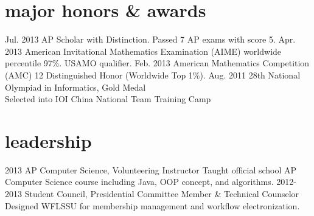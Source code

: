 \documentclass[print]{friggeri-cv} %
\begin{document}



\section{major honors \& awards}

\begin{entrylist}
  \centry
  {Jul. 2013}
  {AP Scholar with Distinction. Passed 7 AP exams with score 5. }
  \centry
  {Apr. 2013}
  {American Invitational Mathematics Examination (AIME) worldwide percentile 97\%. USAMO qualifier. }
  \centry
  {Feb. 2013}
  {American Mathematics Competition (AMC) 12 Distinguished Honor (Worldwide Top 1\%). }
  \centry
  {Aug. 2011}
  {28th National Olympiad in Informatics, Gold Medal \\
  Selected into IOI China National Team Training Camp}
\end{entrylist}



\section{leadership}

\begin{entrylist}
  \entry
  {2013}
  {AP Computer Science, Volunteering Instructor}
  {}
  {Taught official school AP Computer Science course including Java, OOP concept, and algorithms.}
  \entry
  {2012-2013}
  {Student Council, Presidential Committee Member \& Technical Counselor}
  {}
  {Designed WFLSSU for membership management and workflow electronization.}
\end{entrylist}
\end{document}
